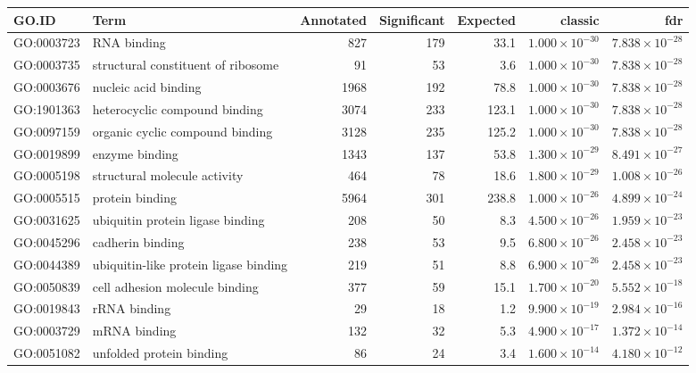 \begin{table}[ht]
\centering
\begin{tabular}{llrrrrr}
  \hline
GO.ID & Term & Annotated & Significant & Expected & classic & fdr \\ 
  \hline
GO:0003723 & RNA binding & 827 & 179 & 33.1 & $1.000 \times 10^{-30}$ & $7.838 \times 10^{-28}$ \\ 
  GO:0003735 & structural constituent of ribosome & 91 & 53 & 3.6 & $1.000 \times 10^{-30}$ & $7.838 \times 10^{-28}$ \\ 
  GO:0003676 & nucleic acid binding & 1968 & 192 & 78.8 & $1.000 \times 10^{-30}$ & $7.838 \times 10^{-28}$ \\ 
  GO:1901363 & heterocyclic compound binding & 3074 & 233 & 123.1 & $1.000 \times 10^{-30}$ & $7.838 \times 10^{-28}$ \\ 
  GO:0097159 & organic cyclic compound binding & 3128 & 235 & 125.2 & $1.000 \times 10^{-30}$ & $7.838 \times 10^{-28}$ \\ 
  GO:0019899 & enzyme binding & 1343 & 137 & 53.8 & $1.300 \times 10^{-29}$ & $8.491 \times 10^{-27}$ \\ 
  GO:0005198 & structural molecule activity & 464 & 78 & 18.6 & $1.800 \times 10^{-29}$ & $1.008 \times 10^{-26}$ \\ 
  GO:0005515 & protein binding & 5964 & 301 & 238.8 & $1.000 \times 10^{-26}$ & $4.899 \times 10^{-24}$ \\ 
  GO:0031625 & ubiquitin protein ligase binding & 208 & 50 & 8.3 & $4.500 \times 10^{-26}$ & $1.959 \times 10^{-23}$ \\ 
  GO:0045296 & cadherin binding & 238 & 53 & 9.5 & $6.800 \times 10^{-26}$ & $2.458 \times 10^{-23}$ \\ 
  GO:0044389 & ubiquitin-like protein ligase binding & 219 & 51 & 8.8 & $6.900 \times 10^{-26}$ & $2.458 \times 10^{-23}$ \\ 
  GO:0050839 & cell adhesion molecule binding & 377 & 59 & 15.1 & $1.700 \times 10^{-20}$ & $5.552 \times 10^{-18}$ \\ 
  GO:0019843 & rRNA binding & 29 & 18 & 1.2 & $9.900 \times 10^{-19}$ & $2.984 \times 10^{-16}$ \\ 
  GO:0003729 & mRNA binding & 132 & 32 & 5.3 & $4.900 \times 10^{-17}$ & $1.372 \times 10^{-14}$ \\ 
  GO:0051082 & unfolded protein binding & 86 & 24 & 3.4 & $1.600 \times 10^{-14}$ & $4.180 \times 10^{-12}$ \\ 

\end{tabular}
\end{table}
